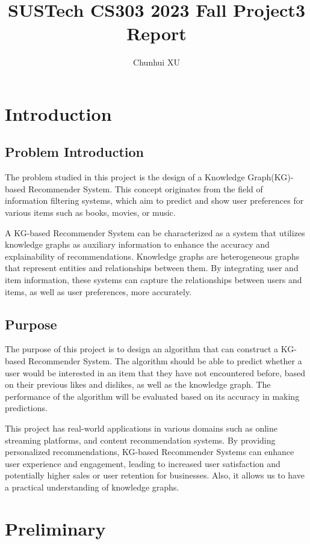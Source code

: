\documentclass[lettersize,journal]{IEEEtran}
\title{SUSTech CS303 2023 Fall Project3 Report}
\author{Chunhui XU}
\begin{document}
\maketitle

\section{Introduction}

\subsection{Problem Introduction}
The problem studied in this project is the design of a Knowledge Graph(KG)-based Recommender System. This concept originates from the field of information filtering systems, which aim to predict and show user preferences for various items such as books, movies, or music.

A KG-based Recommender System can be characterized as a system that utilizes knowledge graphs as auxiliary information to enhance the accuracy and explainability of recommendations. Knowledge graphs are heterogeneous graphs that represent entities and relationships between them. By integrating user and item information, these systems can capture the relationships between users and items, as well as user preferences, more accurately.

\subsection{Purpose}

The purpose of this project is to design an algorithm that can construct a KG-based Recommender System. The algorithm should be able to predict whether a user would be interested in an item that they have not encountered before, based on their previous likes and dislikes, as well as the knowledge graph. The performance of the algorithm will be evaluated based on its accuracy in making predictions.

This project has real-world applications in various domains such as  online streaming platforms, and content recommendation systems. By providing personalized recommendations, KG-based Recommender Systems can enhance user experience and engagement, leading to increased user satisfaction and potentially higher sales or user retention for businesses. Also, it allows us to have a practical understanding of knowledge graphs.

\section{Preliminary}
\end{document}
